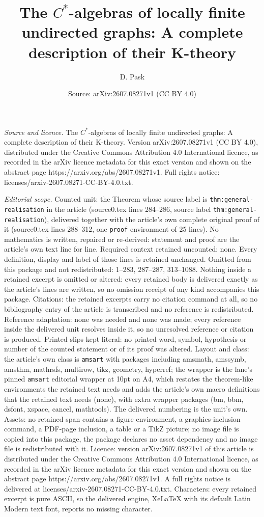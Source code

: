 \documentclass[10pt,a4paper]{amsart}
\title[The $C^*$-algebras of locally finite undirected graphs: A co]{The $C^*$-algebras of locally finite undirected graphs: A complete description of their K-theory}
\author{D. Pask}
\date{Source: arXiv:2607.08271v1 (CC BY 4.0)}
\begin{document}
\maketitle

\noindent\emph{Source and licence.} The $C^*$-algebras of locally finite undirected graphs: A complete description of their K-theory. Version arXiv:2607.08271v1 (CC BY 4.0), distributed under the Creative Commons Attribution 4.0 International licence, as recorded in the arXiv licence metadata for this exact version and shown on the abstract page https://arxiv.org/abs/2607.08271v1. Full rights notice: licenses/arxiv-2607.08271-CC-BY-4.0.txt.\par\smallskip

\noindent\textit{Editorial scope.} Counted unit: the Theorem whose source label is \texttt{thm:general-realisation} in the article (source0.tex lines 284--286, source label \texttt{thm:general-realisation}), delivered together with the article's own complete original proof of it (source0.tex lines 288--312, one \texttt{proof} environment of 25 lines). No mathematics is written, repaired or re-derived: statement and proof are the article's own text line for line. Required context retained uncounted: none. Every definition, display and label of those lines is retained unchanged. Omitted from this package and not redistributed: 1--283, 287--287, 313--1088. Nothing inside a retained excerpt is omitted or altered: every retained body is delivered exactly as the article's lines are written, so no omission receipt of any kind accompanies this package. Citations: the retained excerpts carry no citation command at all, so no bibliography entry of the article is transcribed and no reference is redistributed. Reference adaptation: none was needed and none was made; every reference inside the delivered unit resolves inside it, so no unresolved reference or citation is produced. Printed slips kept literal: no printed word, symbol, hypothesis or number of the counted statement or of its proof was altered. Layout and class: the article's own class is \texttt{amsart} with packages including amsmath, amssymb, amsthm, mathrsfs, multirow, tikz, geometry, hyperref; the wrapper is the lane's pinned \texttt{amsart} editorial wrapper at 10pt on A4, which restates the theorem-like environments the retained text needs and adds the article's own macro definitions that the retained text needs (none), with extra wrapper packages (bm, bbm, dsfont, xspace, cancel, mathtools). The delivered numbering is the unit's own. Assets: no retained span contains a figure environment, a graphics-inclusion command, a PDF-page inclusion, a table or a TikZ picture; no image file is copied into this package, the package declares no asset dependency and no image file is redistributed with it. Licence: version arXiv:2607.08271v1 of this article is distributed under the Creative Commons Attribution 4.0 International licence, as recorded in the arXiv licence metadata for this exact version and shown on the abstract page https://arxiv.org/abs/2607.08271v1. A full rights notice is delivered at licenses/arxiv-2607.08271-CC-BY-4.0.txt. Characters: every retained excerpt is pure ASCII, so the delivered engine, XeLaTeX with its default Latin Modern text font, reports no missing character.
\end{document}
